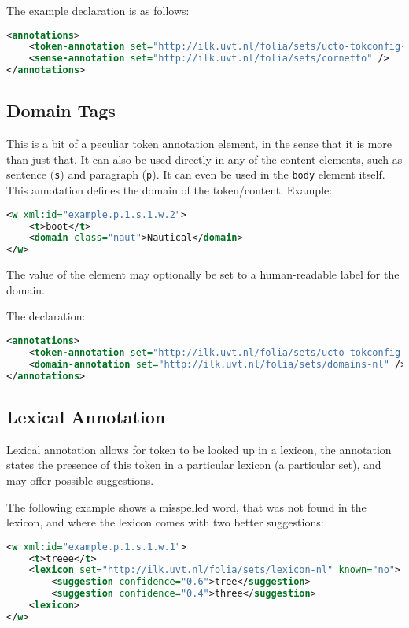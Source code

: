 \documentclass[a4paper,12pt]{report}
\begin{document}
The example declaration is as follows:

\begin{lstlisting}[language=xml]
<annotations>
    <token-annotation set="http://ilk.uvt.nl/folia/sets/ucto-tokconfig-nl" annotator="ucto" annotatortype="auto" />
    <sense-annotation set="http://ilk.uvt.nl/folia/sets/cornetto" />
</annotations>
\end{lstlisting}

\subsection{Domain Tags}

This is a bit of a peculiar token annotation element, in the sense that it is more than just that. It can also be used directly in any of the content elements, such as sentence (\texttt{s}) and  paragraph (\texttt{p}). It can even be used in the \texttt{body} element itself. This annotation defines the domain of the token/content. Example:

\begin{lstlisting}[language=xml]
<w xml:id="example.p.1.s.1.w.2">
    <t>boot</t>
    <domain class="naut">Nautical</domain>
</w>
\end{lstlisting}

The value of the element may optionally be set to a human-readable label for the domain.

The declaration:

\begin{lstlisting}[language=xml]
<annotations>
    <token-annotation set="http://ilk.uvt.nl/folia/sets/ucto-tokconfig-nl" annotator="ucto" annotatortype="auto" />
    <domain-annotation set="http://ilk.uvt.nl/folia/sets/domains-nl" />
</annotations>
\end{lstlisting}

\subsection{Lexical Annotation}

Lexical annotation allows for token to be looked up in a lexicon, the annotation states the presence of this token in a particular lexicon (a particular set), and may offer possible suggestions.

The following example shows a misspelled word, that was not found in the lexicon, and where the lexicon comes with two better suggestions:


\begin{lstlisting}[language=xml]
<w xml:id="example.p.1.s.1.w.1">
    <t>treee</t>
    <lexicon set="http://ilk.uvt.nl/folia/sets/lexicon-nl" known="no">
        <suggestion confidence="0.6">tree</suggestion>
        <suggestion confidence="0.4">three</suggestion>
    <lexicon>
</w>
\end{lstlisting}
\end{document}
